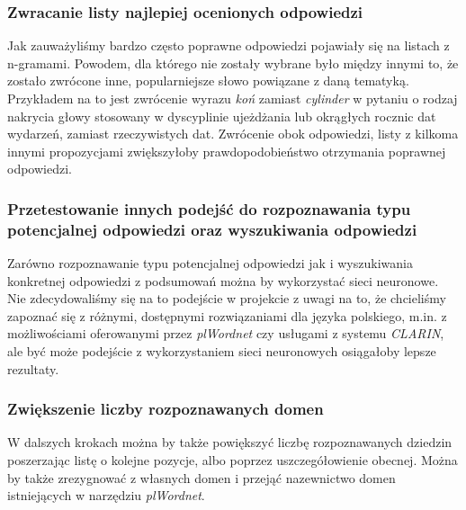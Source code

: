 \subsubsection{Zwracanie listy najlepiej ocenionych odpowiedzi}
Jak zauważyliśmy bardzo często poprawne odpowiedzi pojawiały się na listach z n-gramami. Powodem, dla którego nie zostały wybrane było między innymi to, że zostało zwrócone inne, popularniejsze słowo powiązane z daną tematyką. Przykładem na to jest zwrócenie wyrazu \emph{koń} zamiast \emph{cylinder} w pytaniu o rodzaj nakrycia głowy stosowany w dyscyplinie ujeżdżania lub okrągłych rocznic dat wydarzeń, zamiast rzeczywistych dat. Zwrócenie obok odpowiedzi, listy z kilkoma innymi propozycjami zwiększyłoby prawdopodobieństwo otrzymania poprawnej odpowiedzi.

\subsubsection{Przetestowanie innych podejść do rozpoznawania typu potencjalnej odpowiedzi oraz wyszukiwania odpowiedzi}
Zarówno rozpoznawanie typu potencjalnej odpowiedzi jak i wyszukiwania konkretnej odpowiedzi z podsumowań można by wykorzystać sieci neuronowe. Nie zdecydowaliśmy się na to podejście w projekcie z uwagi na to, że chcieliśmy zapoznać się z różnymi, dostępnymi rozwiązaniami dla języka polskiego, m.in. z możliwościami oferowanymi przez \emph{plWordnet} czy usługami z systemu \emph{CLARIN}, ale być może podejście z wykorzystaniem sieci neuronowych osiągałoby lepsze rezultaty.

\subsubsection{Zwiększenie liczby rozpoznawanych domen}
W dalszych krokach można by także powiększyć liczbę rozpoznawanych dziedzin poszerzając listę o kolejne pozycje, albo poprzez uszczegółowienie obecnej. Można by także zrezygnować z własnych domen i przejąć nazewnictwo domen istniejących w narzędziu \emph{plWordnet}. 

